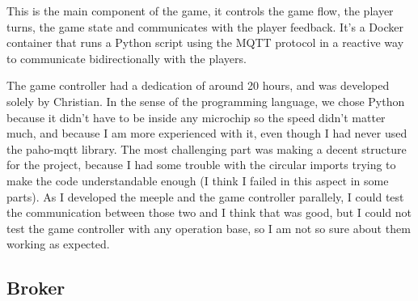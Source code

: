 \documentclass[../main.tex]{subfiles}
\begin{document}
This is the main component of the game, it controls the game flow, the player turns, the game state and communicates with the player feedback. It's a Docker container that runs a Python script using the MQTT protocol in a reactive way to communicate bidirectionally with the players. 

The game controller had a dedication of around 20 hours, and was developed solely by Christian. In the sense of the programming language, we chose Python because it didn't have to be inside any microchip so the speed didn't matter much, and because I am more experienced with it, even though I had never used the paho-mqtt library. The most challenging part was making a decent structure for the project, because I had some trouble with the circular imports trying to make the code understandable enough (I think I failed in this aspect in some parts). As I developed the meeple and the game controller parallely, I could test the communication between those two and I think that was good, but I could not test the game controller with any operation base, so I am not so sure about them working as expected. 

\subsection{Broker}
\end{document}
